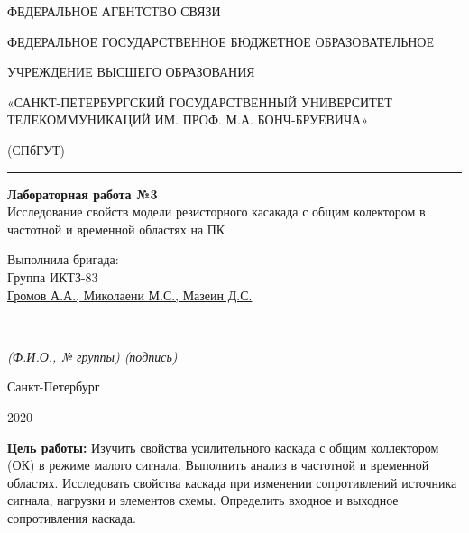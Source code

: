 \documentclass[a4paper,14pt]{extarticle}
\begin{document}
    \begin{center}
        \thispagestyle{empty}
        \begin{singlespace}
        ФЕДЕРАЛЬНОЕ АГЕНТСТВО СВЯЗИ

        ФЕДЕРАЛЬНОЕ ГОСУДАРСТВЕННОЕ БЮДЖЕТНОЕ ОБРАЗОВАТЕЛЬНОЕ

        УЧРЕЖДЕНИЕ ВЫСШЕГО ОБРАЗОВАНИЯ

        «САНКТ-ПЕТЕРБУРГСКИЙ ГОСУДАРСТВЕННЫЙ УНИВЕРСИТЕТ ТЕЛЕКОММУНИКАЦИЙ ИМ. ПРОФ. М.А. БОНЧ-БРУЕВИЧА»

        (СПбГУТ)
        \end{singlespace}
        \vspace{-1ex}
        \rule{\textwidth}{0.4pt}
        \vspace{-5ex}

        \vspace{100px}
        \textbf{Лабораторная работа №3}\\
        Исследование свойств модели резисторного касакада с общим колектором в частотной и временной областях на ПК

    \vspace{100px}
    \end{center}
    \vspace{4ex}
    \begin{flushright}
    \parbox{12 cm}{
    \begin{flushleft}
        Выполнила бригада:\\
        Группа ИКТЗ-83\\
        \underline{Громов А.А., Миколаени М.С., Мазеин Д.С.} \hfill \rule[-0.85ex]{0.09\textwidth}{0.6pt}\\
        \vspace{-1ex}
        \footnotesize \textit{ (Ф.И.О., № группы) \hfill (подпись)} \normalsize


    \end{flushleft}
    }
    \end{flushright}
    \begin{center}
        \vfill
        Санкт-Петербург

        2020

    \end{center}
    \newpage

    \textbf{Цель работы:} Изучить свойства усилительного каскада с общим коллектором (ОК) в режиме малого сигнала. Выполнить анализ в частотной и временной областях. Исследовать свойства каскада при изменении сопротивлений источника сигнала, нагрузки и элементов схемы. Определить входное и выходное сопротивления каскада.
\end{document}
